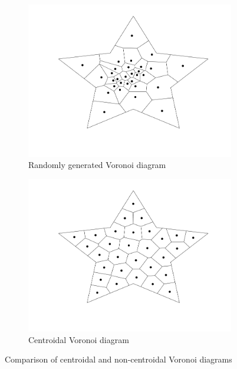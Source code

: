 \begin{figure}[ht]
    \centering
    \begin{subfigure}[b]{0.4\textwidth}
        \centering
        \includegraphics[width=\textwidth]{report/Images/Theory/voronoi/centroidal_voronoi_diagram_0.png}
        \caption{Randomly generated Voronoi diagram}
        \label{fig:notCVD}
    \end{subfigure}
    \begin{subfigure}[b]{0.4\textwidth}
        \centering
        \includegraphics[width=\textwidth]{report/Images/Theory/voronoi/centroidal_voronoi_diagram.png}
        \caption{Centroidal Voronoi diagram}
        \label{fig:CVD}
    \end{subfigure}
    \caption{Comparison of centroidal and non-centroidal Voronoi diagrams}
    \label{fig:CVD_comparison}
\end{figure}

